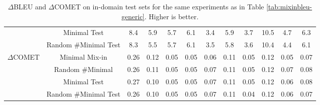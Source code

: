 \documentclass[11pt]{article}
\begin{document}
\begin{table*}[h!]
\begin{tabular}{cc| ccccc|c| ccc|c}
  & Minimal Test & 8.4 &5.9 & 5.7 & 6.1 &  3.4&   5.9&3.7 & 10.5 & 4.7& 6.3\\
   &    Random \#Minimal Test  & 8.3  &  5.5 &  5.7 & 6.1 & 3.5 &   5.8&  3.6 &   10.4 & 4.4& 6.1  \\
 \hline        
 \multirow{4}{*}{$\Delta$COMET}  &    Minimal Mix-in  & 0.26 & 0.12 & 0.05 & 0.05 & 0.06& 0.11   &  0.05& 0.12 & 0.05 & 0.07\\
      &  Random \#Minimal  & 0.26 & 0.11 & 0.05  &  0.05 &0.07 &0.11  &0.05  & 0.12 & 0.07& 0.08 \\
  & Minimal Test  & 0.27 & 0.10 &  0.05& 0.05 &0.07 & 0.11  &0.05  &0.12  & 0.06& 0.08  \\
  &  Random \#Minimal Test  & 0.26 & 0.10 & 0.05  & 0.05 & 0.07 & 0.11  & 0.04  & 0.12 & 0.06&  0.07 \\

    \end{tabular}
    \caption{$\Delta$BLEU and $\Delta$COMET  on in-domain test sets for the same experiments as in Table \ref{tab:mixinbleu-generic}. Higher is better.
    }
    \label{tab:mixinbleu-indomain-appendix}
\end{table*}
\end{document}

